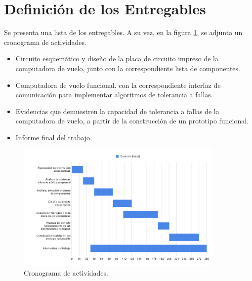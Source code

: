 \section{Definición de los Entregables}

Se presenta una lista de los entregables. A su vez, en la figura \ref{fig:cronograma_actividades}, se adjunta un cronograma de actividades.

\begin{itemize}
    \item Circuito esquemático y diseño de la placa de circuito impreso de la computadora de vuelo, junto con la correspondiente lista de componentes.
    \item Computadora de vuelo funcional, con la correspondiente interfaz de comunicación para implementar algoritmos de tolerancia a fallas.
    \item Evidencias que demuestren la capacidad de tolerancia a fallas de la computadora de vuelo, a partir de la construcción de un prototipo funcional.
    \item Informe final del trabajo.
\end{itemize}

\begin{figure}[H]
    \centering
    \includegraphics[width=0.9\textwidth]{img/plan_de_actividades_tentativo.png}
    \caption{Cronograma de actividades.}
    \label{fig:cronograma_actividades}   
\end{figure}